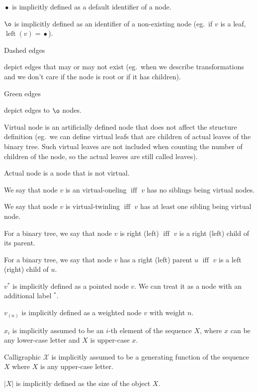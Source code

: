 \documentclass[final]{article}
\theoremstyle{definition}
\theoremstyle{remark}
\newcommand{\gf}[1]{\ensuremath{\mathcal{#1}}}
\newcommand{\pointed}[1]{\ensuremath{{#1}^*}}
\newcommand{\weighted}[1]{\ensuremath{_{(#1)}}}
\newcommand{\size}[1]{\ensuremath{\left|#1\right|}}
\DeclareMathOperator{\textiff}{\text{iff}}
\DeclareMathOperator{\tleft}{\text{left}}
\DeclareMathOperator{\n}{\bullet}
\DeclareMathOperator{\no}{\o}
\begin{document}
\(\n\) is implicitly defined as a default identifier of a node.

\(\no\) is implicitly defined as an identifier of a non-existing node (eg.\ if \(v\) is a leaf, \(\tleft(v) = \n\)).

Dashed edges 
\begin{minipage}{1.5em}

\end{minipage}
depict edges that may or may not exist (eg.\ when we describe transformations and we don't care if the node is root or if it has children).

Green edges 
\begin{minipage}{1.5em}

\end{minipage}
depict edges to \(\no\) nodes.

Virtual node is an artificially defined node that does not affect the structure definition (eg.\ we can define virtual leafs that are children of actual leaves of the binary tree. Such virtual leaves are not included when counting the number of children of the node, so the actual leaves are still called leaves).

Actual node is a node that is not virtual.

We say that node \(v\) is an virtual-oneling \(\textiff\) \(v\) has no siblings being virtual nodes.

We say that node \(v\) is virtual-twinling \(\textiff\) \(v\) has at least one sibling being virtual node.

For a binary tree, we say that node \(v\) is right (left) \(\textiff\) \(v\) is a right (left) child of its parent.

For a binary tree, we say that node \(v\) has a right (left) parent \(u\) \(\textiff\) \(v\) is a left (right) child of \(u\).

\(\pointed{v}\) is implicitly defined as a pointed node \(v\). We can treat it as a node with an additional label \(\pointed{}\).

\(v\weighted{n}\) is implicitly defined as a weighted node \(v\) with weight \(n\).

\(x_i\) is implicitly assumed to be an \(i\)-th element of the sequence \(X\), where \(x\) can be any lower-case letter and \(X\) is upper-case \(x\).

Calligraphic \(\gf{X}\) is implicitly assumed to be a generating function of the sequence \(X\) where \(X\) is any upper-case letter.

\(\size{X}\) is implicitly defined as the size of the object \(X\).
\end{document}
